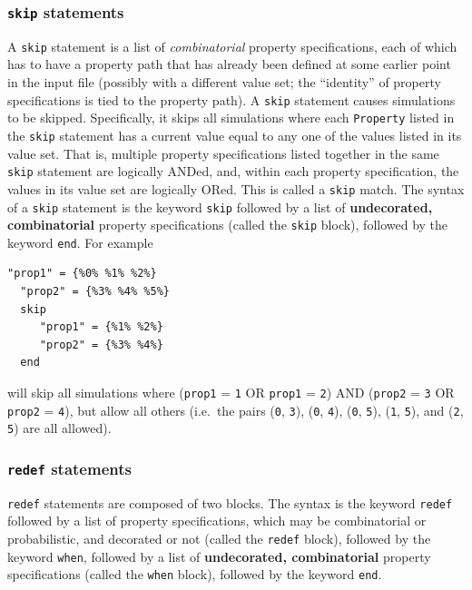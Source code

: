 \documentclass{article}
\begin{document}
\subsubsection{{\tt skip} statements}
\label{psl:control-struct:skip}

A {\tt skip} statement is a list of \textit{combinatorial} property specifications, each of which has to have a property path that has already been defined at some earlier point in the input file (possibly with a different value set; the ``identity'' of property specifications is tied to the property path). A {\tt skip} statement causes simulations to be skipped. Specifically, it skips all simulations where each {\tt Property} listed in the {\tt skip} statement has a current value equal to any one of the values listed in its value set. That is, multiple property specifications listed together in the same {\tt skip} statement are logically ANDed, and, within each property specification, the values in its value set are logically ORed. This is called a {\tt skip} match. The syntax of a {\tt skip} statement is the keyword {\tt skip} followed by a list of \textbf{undecorated, combinatorial} property specifications (called the {\tt skip} block), followed by the keyword {\tt end}. For example

\begin{lstlisting}[]
  "prop1" = {%0% %1% %2%}
  "prop2" = {%3% %4% %5%}
  skip
     "prop1" = {%1% %2%}
     "prop2" = {%3% %4%}
  end
\end{lstlisting}

will skip all simulations where ({\tt prop1} = {\tt 1} OR {\tt prop1} = {\tt 2}) AND ({\tt prop2} = {\tt 3} OR {\tt prop2} = {\tt 4}), but allow all others (i.e.\ the pairs ({\tt 0}, {\tt 3}), ({\tt 0}, {\tt 4}), ({\tt 0}, {\tt 5}), ({\tt 1}, {\tt 5}), and ({\tt 2}, {\tt 5}) are all allowed).

\subsubsection{{\tt redef} statements}
\label{psl:control-struct:redef}

{\tt redef} statements are composed of two blocks. The syntax is the keyword {\tt redef} followed by a list of property specifications, which may be combinatorial or probabilistic, and decorated or not (called the {\tt redef} block), followed by the keyword {\tt when}, followed by a list of \textbf{undecorated, combinatorial} property specifications (called the {\tt when} block), followed by the keyword {\tt end}.
\end{document}
